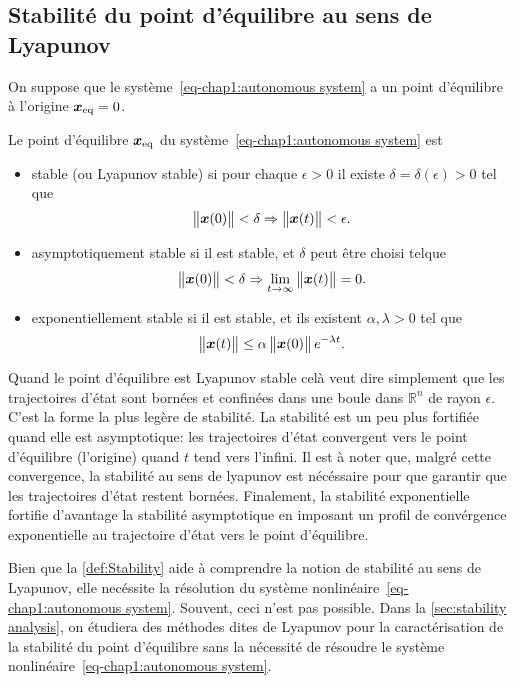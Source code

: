 \subsection{Stabilité du point d'équilibre au sens de Lyapunov}
On suppose que le système~\eqref{eq-chap1:autonomous system} a un point d'équilibre à l'origine $\bm{x}_{\rm eq}=0$.
\begin{definition}\label{def:Stability}\cite[Définition~4.1]{khalil2002NonLinearSystems}
	Le point d'équilibre $\bm{x}_{\rm eq}$ du système~\eqref{eq-chap1:autonomous system} est 
	\begin{itemize}
		\item stable (ou Lyapunov stable) si pour chaque $\epsilon>0$ il existe $\delta=\delta(\epsilon)>0$ tel que
		\begin{equation}\label{eq-chap1:lyapunov stable}
			\begin{Vmatrix} \bm{x}(0) \end{Vmatrix}<\delta\Rightarrow\begin{Vmatrix} \bm{x}(t) \end{Vmatrix}<\epsilon.
		\end{equation}
		\item asymptotiquement stable si il est stable, et $\delta$ peut être choisi telque 
		\begin{equation}\label{eq-chap1:asymptotic stable}
			\begin{Vmatrix} \bm{x}(0) \end{Vmatrix}<\delta\Rightarrow\underset{t\rightarrow\infty}{\lim}\begin{Vmatrix} \bm{x}(t) \end{Vmatrix}=0.
		\end{equation}
		\item exponentiellement stable si il est stable, et ils existent $\alpha,\lambda>0$ tel que
		\begin{equation}\label{eq-chap1:exp stable}
			\begin{Vmatrix} \bm{x}(t) \end{Vmatrix}\leq\alpha\begin{Vmatrix} \bm{x}(0) \end{Vmatrix}e^{-\lambda t}.
		\end{equation}
	\end{itemize}
\end{definition}
Quand le point d'équilibre est Lyapunov stable celà veut dire simplement que les trajectoires d'état sont bornées et confinées dans une boule dans $\mathbb{R}^n$ de rayon $\epsilon$. C'est la forme la plus legère de stabilité. La stabilité est un peu plus fortifiée quand elle est asymptotique:  les trajectoires d'état convergent vers le point d'équilibre (l'origine) quand $t$ tend vers l'infini. Il est à noter que, malgré cette convergence, la stabilité au sens de lyapunov est nécéssaire pour que garantir que les trajectoires d'état restent bornées. Finalement, la stabilité exponentielle fortifie d'avantage la stabilité asymptotique en imposant un profil de convérgence exponentielle au trajectoire d'état vers le point d'équilibre.

Bien que la \cref{def:Stability} aide à comprendre la notion de stabilité au sens de Lyapunov, elle necéssite la résolution du système nonlinéaire~\eqref{eq-chap1:autonomous system}. Souvent, ceci n'est pas possible. Dans la \cref{sec:stability analysis}, on étudiera des méthodes dites de Lyapunov pour la caractérisation de la stabilité du point d'équilibre sans la nécessité de résoudre le système nonlinéaire~\eqref{eq-chap1:autonomous system}. 

